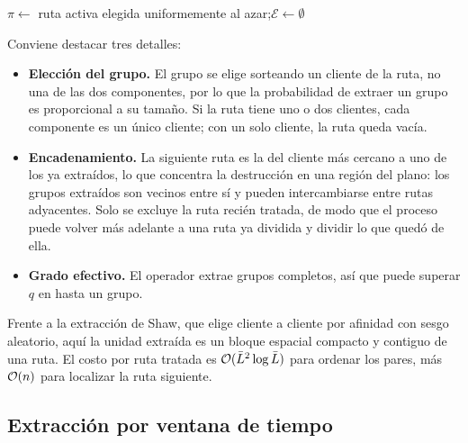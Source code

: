 \begin{algorithm}[H]
\caption{ ()}
\label{alg:cluster}
$\pi\gets$ ruta activa elegida uniformemente al azar;\quad $\mathcal{E}\gets\emptyset$ 
\end{algorithm}

Conviene destacar tres detalles:
\begin{itemize}
\item \textbf{Elección del grupo.} El grupo se elige sorteando un cliente de la ruta, no una
de las dos componentes, por lo que la probabilidad de extraer un grupo es proporcional a su
tamaño. Si la ruta tiene uno o dos clientes, cada componente es un único cliente; con un solo
cliente, la ruta queda vacía.
\item \textbf{Encadenamiento.} La siguiente ruta es la del cliente más cercano a uno de los ya
extraídos, lo que concentra la destrucción en una región del plano: los grupos extraídos son
vecinos entre sí y pueden intercambiarse entre rutas adyacentes. Solo se excluye la ruta
recién tratada, de modo que el proceso puede volver más adelante a una ruta ya dividida y
dividir lo que quedó de ella.
\item \textbf{Grado efectivo.} El operador extrae grupos completos, así que puede superar $q$
en hasta un grupo.
\end{itemize}
Frente a la extracción de Shaw, que elige cliente a cliente por afinidad con sesgo aleatorio,
aquí la unidad extraída es un bloque espacial compacto y contiguo de una ruta. El costo por
ruta tratada es $\mathcal{O}(\bar{L}^{2}\log\bar{L})$ para ordenar los pares, más $\mathcal{O}(n)$ para
localizar la ruta siguiente.

\subsection{Extracción por ventana de tiempo}

